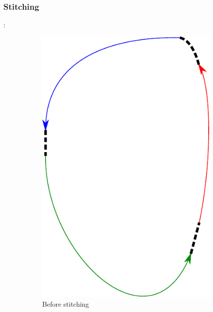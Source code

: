 \documentclass[fontsize=9pt,twocolumns,enabledeprecatedfontcommands]{scrartcl}
\begin{document}
\subsubsection{Stitching}:
\begin{figure}[htbp]
	\centering
	
	\begin{subfigure}{0.4\textwidth}
		
		\centering
		\includegraphics[angle=90,width=\linewidth,height=0.15\textheight]{stitch1}
		\caption{Before stitching}
		\label{stitch1}
		
	\end{subfigure}
	\vspace{2em}
	\begin{subfigure}{0.4\textwidth}
		

\end{subfigure}
\end{figure}
\end{document}
